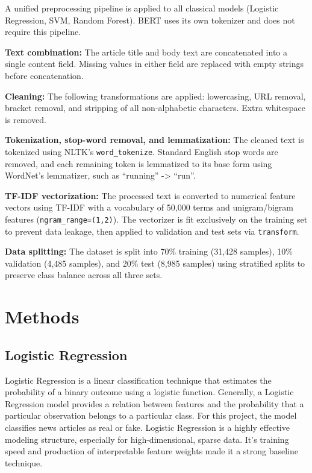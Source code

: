 \documentclass{article}
\begin{document}
A unified preprocessing pipeline is applied to all classical models (Logistic Regression, SVM, Random Forest). BERT uses its own tokenizer and does not require this pipeline.

\textbf{Text combination:} The article title and body text are concatenated into a single content field. Missing values in either field are replaced with empty strings before concatenation.

\textbf{Cleaning:} The following transformations are applied: lowercasing, URL removal, bracket removal, and stripping of all non-alphabetic characters. Extra whitespace is removed.

\textbf{Tokenization, stop-word removal, and lemmatization:} The cleaned text is tokenized using NLTK's \texttt{word\_tokenize}. Standard English stop words are removed, and each remaining token is lemmatized to its base form using WordNet's lemmatizer, such as ``running'' -> ``run''.

\textbf{TF-IDF vectorization:} The processed text is converted to numerical feature vectors using TF-IDF with a vocabulary of 50,000 terms and unigram/bigram features (\texttt{ngram\_range=(1,2)}). The vectorizer is fit exclusively on the training set to prevent data leakage, then applied to validation and test sets via \texttt{transform}.

\textbf{Data splitting:} The dataset is split into 70\% training (31,428 samples), 10\% validation (4,485 samples), and 20\% test (8,985 samples) using stratified splits to preserve class balance across all three sets.

\section{Methods}

\subsection{Logistic Regression}
Logistic Regression is a linear classification technique that estimates the probability of a binary outcome using a logistic function. Generally, a Logistic Regression model provides a relation between features and the probability that a particular observation belongs to a particular class. For this project, the model classifies news articles as real or fake. Logistic Regression is a highly effective modeling structure, especially for high-dimensional, sparse data. It’s training speed and production of interpretable feature weights made it a strong baseline technique.
\end{document}
